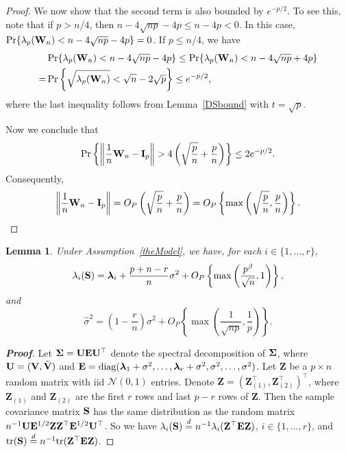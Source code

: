 \documentclass[times,sort&compress,3p]{elsarticle}
\newcommand{\mytr}{ {\rm tr} }
\newcommand{\mydiag}{ {\rm diag} }
\newcommand{\bZ}{\mathbf{Z}}
\newcommand{\bfsym}[1]{\ensuremath{\boldsymbol{#1}}}
\def\blambda {\bfsym {\lambda}}        \def\bLambda {\bfsym {\Lambda}}
\theoremstyle{plain}
\newtheorem{lemma}{\quad\quad Lemma}
\theoremstyle{definition}
\theoremstyle{remark}
\begin{document}
\begin{appendices}
\begin{proof}
    We now show that the second term is also bounded by $e^{-p/2}$.
    To see this, note that if $p>n/4$, then $n-4\sqrt{np}-4p\leq n-4p<0$.
    In this case, $\Pr\{\lambda_p(\mathbf{W}_n)<n-4\sqrt{np}-4p\}=0$.
    If $p\leq n/4$, we have
    \begin{align*}
        &\Pr\{\lambda_p(\mathbf{W}_n)<n-4\sqrt{np}-4p\}
    \leq
    \Pr\{\lambda_p(\mathbf{W}_n)<n-4\sqrt{np}+4p\}\\
        =&
        \Pr\left\{\sqrt{\lambda_p(\mathbf{W}_n)}<\sqrt{n}-2\sqrt{p}\right\}
        \leq e^{-p/2},
    \end{align*}
    where the last inequality follows from Lemma~\ref{DSbound} with $t=\sqrt{p}$.

    Now we conclude that
    $$
    \Pr\left\{\left\|\frac{1}{n}\BW_n-\BI_p\right\|>4\left(\sqrt{\frac{p}{n}}+\frac{p}{n}\right)\right\}
    \leq 2 e^{-p/2}.
    $$
    Consequently,
    $$\left\|\frac{1}{n}\mathbf{W}_n-\mathbf{I}_p\right\|=O_P\left(\sqrt{\frac{p}{n}}+\frac{p}{n}\right)=O_P\left\{\max\left(\sqrt{\frac{p}{n}},\frac{p}{n}\right)\right\}.$$
\end{proof}



\begin{lemma}\label{eigenconsisLemma}
    Under Assumption~\ref{theModel}, we have, for each $i\in\{1,\ldots,r\}$,
    \begin{equation}\label{eigenconsisResult1}
        \lambda_i(\BS)= \blambda_i+\frac{p+n-r}{n}\sigma^2+
        O_P\left\{\max\left(\frac{p^{\beta}}{\sqrt{n}},1\right)\right\},
    \end{equation}
    and
    \begin{equation}\label{eigenconsisResult2}
        \hat{\sigma}^2=
\left(1-\frac{r}{n}\right)\sigma^2+
O_P\left\{\max\left(\frac{1}{\sqrt{np}},\frac{1}{p}\right)\right\}.
    \end{equation}
\end{lemma}
\begin{proof}[\textbf{Proof}]
    Let $\bSigma=\BU\BE\BU^\top $ denote the spectral decomposition of $\bSigma$, where
     $\mathbf{U}=(\mathbf{V},\tilde{\mathbf{V}})$ and $\BE=\mydiag(\blambda_1+\sigma^2,\ldots,\blambda_r+\sigma^2,\sigma^2,\ldots,\sigma^2)$.
    Let $\bZ$ be a $p\times n$ random matrix with iid $\mathcal{N}(0,1)$ entries.
Denote $\bZ={(\bZ_{(1)}^\top ,\bZ_{(2)}^\top )}^\top $, where $\bZ_{(1)}$ and $\bZ_{(2)}$ are the first $r$ rows and last $p-r$ rows of $\bZ$. 
Then the sample covariance matrix $\mathbf{S}$ has the same distribution as the random matrix
$
    n^{-1} \BU \BE^{1/2} \bZ \bZ^\top  \BE^{1/2} \BU^\top 
$.
So we have $\lambda_i(\BS)\overset{d}{=} n^{-1}\lambda_i(\bZ^\top  \BE \bZ)$, $i\in\{1,\ldots,r\}$, and $\mytr(\BS)\overset{d}{=} n^{-1}\mytr(\BZ^\top  \BE \BZ)$.


\end{proof}
\end{appendices}
\end{document}
